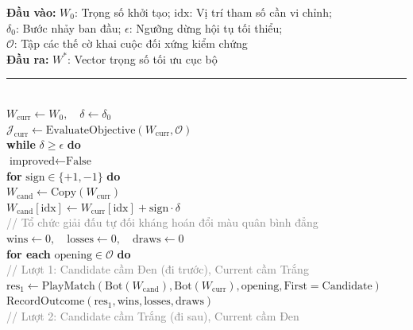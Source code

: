 \documentclass[11pt,a4paper]{article}
\begin{document}
\begin{tcolorbox}[breakable, enhanced, colback=lightbg, colframe=primary, arc=2pt, boxrule=1pt, title={\textbf{Thuật toán 2: Step-by-Step Hill Climbing Optimization via Tournament Self-Play}}, coltitle=white, fonttitle=\small\bfseries]
\small
\textbf{Đầu vào:} $W_0$: Trọng số khởi tạo; $\text{idx}$: Vị trí tham số cần vi chỉnh;\\
 $\delta_0$: Bước nhảy ban đầu; $\epsilon$: Ngưỡng dừng hội tụ tối thiểu;\\
 $\mathcal{O}$: Tập các thế cờ khai cuộc đối xứng kiểm chứng\\
\textbf{Đầu ra:} $W^*$: Vector trọng số tối ưu cục bộ\\[3pt]
\rule{\textwidth}{0.4pt}\\[4pt]
$W_{\text{curr}} \leftarrow W_0, \quad \delta \leftarrow \delta_0$\\
$\mathcal{J}_{\text{curr}} \leftarrow \text{EvaluateObjective}(W_{\text{curr}}, \mathcal{O})$\\[4pt]
\textbf{while} $\delta \ge \epsilon$ \textbf{do}\\
\quad $\text{improved} \leftarrow \text{False}$\\
\quad \textbf{for} $\text{sign} \in \{+1, -1\}$ \textbf{do}\\
\quad\quad $W_{\text{cand}} \leftarrow \text{Copy}(W_{\text{curr}})$\\
\quad\quad $W_{\text{cand}}[\text{idx}] \leftarrow W_{\text{curr}}[\text{idx}] + \text{sign} \cdot \delta$\\
\quad\quad \textcolor{gray}{// Tổ chức giải đấu tự đối kháng hoán đổi màu quân bình đẳng}\\
\quad\quad $\text{wins} \leftarrow 0, \quad \text{losses} \leftarrow 0, \quad \text{draws} \leftarrow 0$\\
\quad\quad \textbf{for each} $\text{opening} \in \mathcal{O}$ \textbf{do}\\
\quad\quad\quad \textcolor{gray}{// Lượt 1: Candidate cầm Đen (đi trước), Current cầm Trắng}\\
\quad\quad\quad $\text{res}_1 \leftarrow \text{PlayMatch}(\text{Bot}(W_{\text{cand}}), \text{Bot}(W_{\text{curr}}), \text{opening}, \text{First}=\text{Candidate})$\\
\quad\quad\quad $\text{RecordOutcome}(\text{res}_1, \text{wins}, \text{losses}, \text{draws})$\\
\quad\quad\quad \textcolor{gray}{// Lượt 2: Candidate cầm Trắng (đi sau), Current cầm Đen}\\

\end{tcolorbox}
\end{document}
